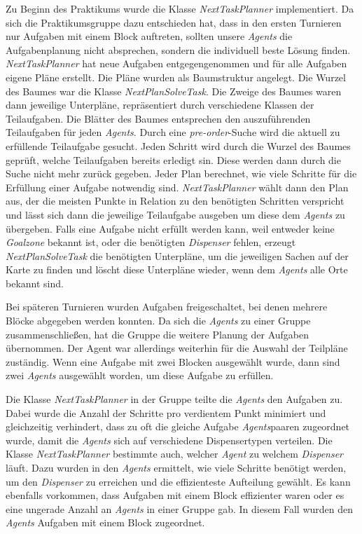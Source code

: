 Zu Beginn des Praktikums wurde die Klasse \textit{NextTaskPlanner} implementiert. Da sich die Praktikumsgruppe dazu entschieden hat, dass in den ersten Turnieren nur Aufgaben mit einem Block auftreten, sollten unsere \textit{Agents} die Aufgabenplanung nicht absprechen, sondern die individuell beste Lösung finden. \textit{NextTaskPlanner} hat neue Aufgaben entgegengenommen und für alle Aufgaben eigene Pläne erstellt.
Die Pläne wurden als Baumstruktur angelegt. Die Wurzel des Baumes war die Klasse \textit{NextPlanSolveTask}. Die Zweige des Baumes waren dann jeweilige Unterpläne, repräsentiert durch verschiedene Klassen der Teilaufgaben. Die Blätter des Baumes entsprechen den auszuführenden Teilaufgaben für jeden \textit{Agents}. 
Durch eine \textit{pre-order}-Suche wird die aktuell zu erfüllende Teilaufgabe gesucht. Jeden Schritt wird durch die Wurzel des Baumes geprüft, welche Teilaufgaben bereits erledigt sin. Diese werden dann durch die Suche nicht mehr zurück gegeben.
Jeder Plan berechnet, wie viele Schritte für die Erfüllung einer Aufgabe notwendig sind. \textit{NextTaskPlanner} wählt dann den Plan aus, der die meisten Punkte in Relation zu den benötigten Schritten verspricht und lässt sich dann die jeweilige Teilaufgabe ausgeben um diese dem \textit{Agents} zu übergeben.
Falls eine Aufgabe nicht erfüllt werden kann, weil entweder keine \textit{Goalzone} bekannt ist, oder die benötigten \textit{Dispenser} fehlen, erzeugt \textit{NextPlanSolveTask} die benötigten Unterpläne, um die jeweiligen Sachen auf der Karte zu finden und löscht diese Unterpläne wieder, wenn dem \textit{Agents} alle Orte bekannt sind. \newline

Bei späteren Turnieren wurden Aufgaben freigeschaltet, bei denen mehrere Blöcke abgegeben werden konnten. Da sich die \textit{Agents} zu einer Gruppe zusammenschließen, hat die Gruppe die weitere Planung der Aufgaben übernommen. Der Agent war allerdings weiterhin für die Auswahl der Teilpläne zuständig.
Wenn eine Aufgabe mit zwei Blocken ausgewählt wurde, dann sind zwei \textit{Agents} ausgewählt worden, um diese Aufgabe zu erfüllen. 

Die Klasse \textit{NextTaskPlanner} in der Gruppe teilte die \textit{Agents} den Aufgaben zu. Dabei wurde die Anzahl der Schritte pro verdientem Punkt minimiert und gleichzeitig verhindert, dass zu oft die gleiche Aufgabe \textit{Agents}paaren zugeordnet wurde, damit die \textit{Agents} sich auf verschiedene Dispensertypen verteilen. Die Klasse \textit{NextTaskPlanner} bestimmte auch, welcher \textit{Agent} zu welchem \textit{Dispenser} läuft. Dazu wurden in den \textit{Agents} ermittelt, wie viele Schritte benötigt werden, um den \textit{Dispenser} zu erreichen und die effizienteste Aufteilung gewählt.
Es kann ebenfalls vorkommen, dass Aufgaben mit einem Block effizienter waren oder es eine ungerade Anzahl an \textit{Agents} in einer Gruppe gab. In diesem Fall wurden den \textit{Agents} Aufgaben mit einem Block zugeordnet.

